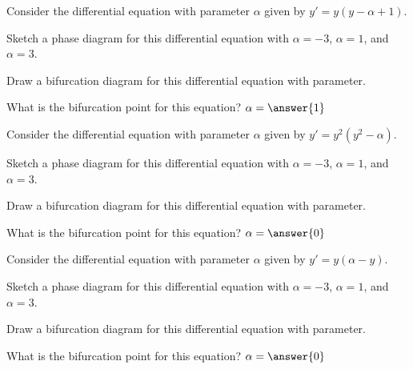 \documentclass{ximera}
\begin{document}
\begin{exercise}
    Consider the differential equation with parameter $\alpha$ given by $y' = y(y - \alpha + 1)$. 
    \begin{hint}
        Sketch a phase diagram for this differential equation with $\alpha = -3$, $\alpha = 1$, and $\alpha = 3$.
    \end{hint}
    \begin{hint}
        Draw a bifurcation diagram for this differential equation with parameter. 
    \end{hint}
     What is the bifurcation point for this equation? $\alpha = \answer{1}$
     

\end{exercise}

\begin{exercise}
    Consider the differential equation with parameter $\alpha$ given by $y' = y^2(y^2 - \alpha)$. 
    \begin{hint}
        Sketch a phase diagram for this differential equation with $\alpha = -3$, $\alpha = 1$, and $\alpha = 3$.
    \end{hint}
    \begin{hint}
        Draw a bifurcation diagram for this differential equation with parameter. 
    \end{hint}
        What is the bifurcation point for this equation? $\alpha = \answer{0}$
        

\end{exercise}

\begin{exercise}
    Consider the differential equation with parameter $\alpha$ given by $y' = y(\alpha - y)$. 
    \begin{hint}
        Sketch a phase diagram for this differential equation with $\alpha = -3$, $\alpha = 1$, and $\alpha = 3$.
    \end{hint}
    \begin{hint}
        Draw a bifurcation diagram for this differential equation with parameter. 
    \end{hint}
        What is the bifurcation point for this equation? $\alpha = \answer{0}$
        
\end{exercise}
\end{document}
